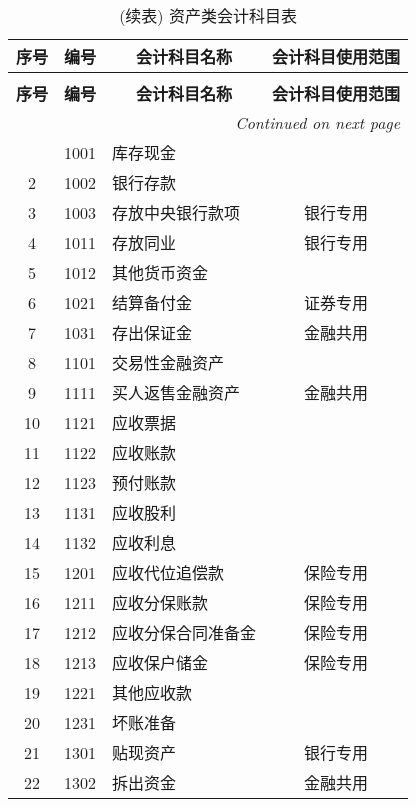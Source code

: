 \documentclass[a4paper]{ctexart}    %
\begin{document}
\begin{center}
    \begin{longtable}{|c|c|p{6cm}|c|}
\caption{资产类会计科目表}\\
\hline
\textbf{序号} & \textbf{编号} & \multicolumn{1}{c|}{\textbf{会计科目名称}} & \textbf{会计科目使用范围} \\
\hline \hline
\endfirsthead
\caption{(续表) 资产类会计科目表}\\
\hline
\textbf{序号} & \textbf{编号} & \multicolumn{1}{c|}{\textbf{会计科目名称}} & \textbf{会计科目使用范围} \\
\hline \hline
\endhead
\hline
\multicolumn{4}{|r|}{\textit{Continued on next page}} \\\hline
\endfoot
\hline
\endlastfoot
1 & 1001 & 库存现金 & \\\hline
2 & 1002 & 银行存款 & \\\hline
3 & 1003 & 存放中央银行款项 & 银行专用 \\\hline
4 & 1011 & 存放同业 & 银行专用 \\\hline
5 & 1012 & 其他货币资金 & \\\hline
6 & 1021 & 结算备付金 & 证券专用 \\\hline
7 & 1031 & 存出保证金 & 金融共用 \\\hline
8 & 1101 & 交易性金融资产 &  \\\hline
9 & 1111 & 买人返售金融资产 & 金融共用 \\\hline
10 & 1121 & 应收票据 & \\\hline
11 & 1122 & 应收账款 & \\\hline
12 & 1123 & 预付账款 & \\\hline
13 & 1131 & 应收股利 & \\\hline
14 & 1132 & 应收利息 & \\\hline
15 & 1201 & 应收代位追偿款 & 保险专用 \\\hline
16 & 1211 & 应收分保账款 & 保险专用 \\\hline
17 & 1212 & 应收分保合同准备金 & 保险专用 \\\hline
18 & 1213 & 应收保户储金 & 保险专用 \\\hline
19 & 1221 & 其他应收款 & \\\hline
20 & 1231 & 坏账准备 & \\\hline
21 & 1301 & 贴现资产 & 银行专用 \\\hline
22 & 1302 & 拆出资金 & 金融共用 \\\hline

\end{longtable}
\end{center}
\end{document}
